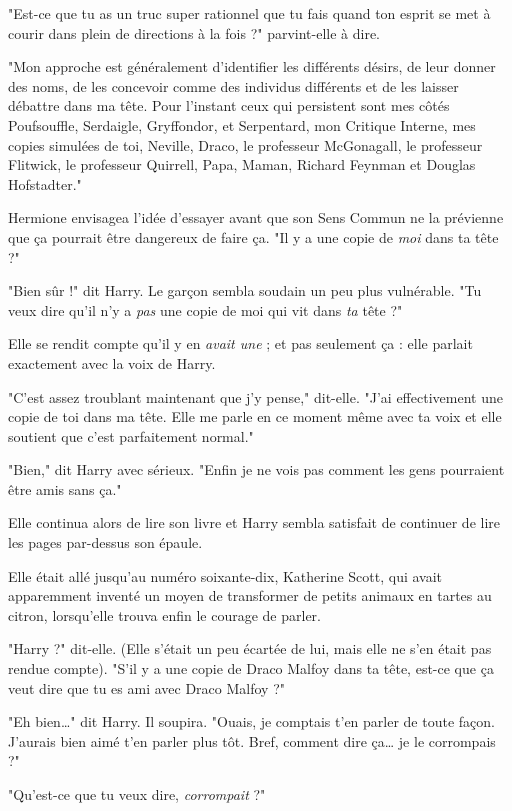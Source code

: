 "Est-ce que tu as un truc super rationnel que tu fais quand ton esprit se met à courir dans plein de directions à la fois ?" parvint-elle à dire.

"Mon approche est généralement d'identifier les différents désirs, de leur donner des noms, de les concevoir comme des individus différents et de les laisser débattre dans ma tête. Pour l'instant ceux qui persistent sont mes côtés Poufsouffle, Serdaigle, Gryffondor, et Serpentard, mon Critique Interne, mes copies simulées de toi, Neville, Draco, le professeur McGonagall, le professeur Flitwick, le professeur Quirrell, Papa, Maman, Richard Feynman et Douglas Hofstadter."

Hermione envisagea l'idée d'essayer avant que son Sens Commun ne la prévienne que ça pourrait être dangereux de faire ça. "Il y a une copie de \emph{moi}  dans ta tête ?"

"Bien sûr !" dit Harry. Le garçon sembla soudain un peu plus vulnérable. "Tu veux dire qu'il n'y a \emph{pas}  une copie de moi qui vit dans \emph{ta}  tête ?"

Elle se rendit compte qu'il y en \emph{avait une}  ; et pas seulement ça : elle parlait exactement avec la voix de Harry.

"C'est assez troublant maintenant que j'y pense," dit-elle. "J'ai effectivement une copie de toi dans ma tête. Elle me parle en ce moment même avec ta voix et elle soutient que c'est parfaitement normal."

"Bien," dit Harry avec sérieux. "Enfin je ne vois pas comment les gens pourraient être amis sans ça."

Elle continua alors de lire son livre et Harry sembla satisfait de continuer de lire les pages par-dessus son épaule.

Elle était allé jusqu'au numéro soixante-dix, Katherine Scott, qui avait apparemment inventé un moyen de transformer de petits animaux en tartes au citron, lorsqu'elle trouva enfin le courage de parler.

"Harry ?" dit-elle. (Elle s'était un peu écartée de lui, mais elle ne s'en était pas rendue compte). "S'il y a une copie de Draco Malfoy dans ta tête, est-ce que ça veut dire que tu es ami avec Draco Malfoy ?"

"Eh bien…" dit Harry. Il soupira. "Ouais, je comptais t'en parler de toute façon. J'aurais bien aimé t'en parler plus tôt. Bref, comment dire ça… je le corrompais ?"

"Qu'est-ce que tu veux dire, \emph{corrompait}  ?"

